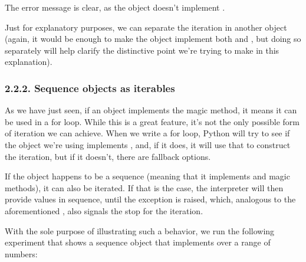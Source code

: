 \documentclass[a4paper,10pt,english]{sphinxmanual}
\begin{document}
The error message is clear, as the object doesn’t implement .

Just for explanatory purposes, we can separate the iteration in another object (again, it
would be enough to make the object implement both  and , but doing
so separately will help clarify the distinctive point we’re trying to make in this explanation).


\subsubsection{2.2.2. Sequence objects as iterables}
\label{\detokenize{chapters/7_generators/index:sequence-objects-as-iterables}}
As we have just seen, if an object implements the  magic method, it means it
can be used in a for loop. While this is a great feature, it’s not the only possible form of
iteration we can achieve. When we write a for loop, Python will try to see if the object
we’re using implements , and, if it does, it will use that to construct the iteration,
but if it doesn’t, there are fallback options.

If the object happens to be a sequence (meaning that it implements 
and  magic methods), it can also be iterated. If that is the case, the interpreter
will then provide values in sequence, until the  exception is raised, which,
analogous to the aforementioned , also signals the stop for the iteration.

With the sole purpose of illustrating such a behavior, we run the following experiment that
shows a sequence object that implements  over a range of numbers:
\end{document}
